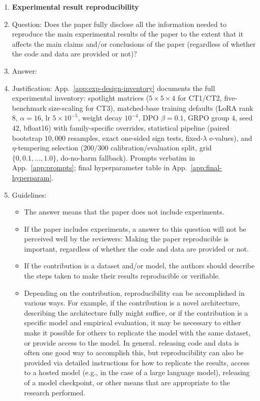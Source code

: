 \begin{enumerate}
\item \textbf{Experimental result reproducibility}
    \item[] Question: Does the paper fully disclose all the information needed to reproduce the main experimental results of the paper to the extent that it affects the main claims and/or conclusions of the paper (regardless of whether the code and data are provided or not)?
    \item[] Answer: \answerYes{}
    \item[] Justification: App.~\ref{app:exp-design-inventory} documents the full experimental inventory: spotlight matrices ($5\!\times\!5\!\times\!4$ for CT1/CT2, five-benchmark size-scaling for CT3), matched-base training defaults (LoRA rank $8$, $\alpha\!=\!16$, lr $5\!\times\!10^{-5}$, weight decay $10^{-4}$, DPO $\beta\!=\!0.1$, GRPO group $4$, seed $42$, bfloat16) with family-specific overrides, statistical pipeline (paired bootstrap $10{,}000$ resamples, exact one-sided sign tests, fixed-$\lambda$ e-values), and $\eta$-tempering selection ($200/300$ calibration/evaluation split, grid $\{0,0.1,\ldots,1.0\}$, do-no-harm fallback). Prompts verbatim in App.~\ref{app:prompts}; final hyperparameter table in App.~\ref{app:final-hyperparam}.
    \item[] Guidelines:
    \begin{itemize}
        \item The answer \answerNA{} means that the paper does not include experiments.
        \item If the paper includes experiments, a \answerNo{} answer to this question will not be perceived well by the reviewers: Making the paper reproducible is important, regardless of whether the code and data are provided or not.
        \item If the contribution is a dataset and\slash or model, the authors should describe the steps taken to make their results reproducible or verifiable.
        \item Depending on the contribution, reproducibility can be accomplished in various ways. For example, if the contribution is a novel architecture, describing the architecture fully might suffice, or if the contribution is a specific model and empirical evaluation, it may be necessary to either make it possible for others to replicate the model with the same dataset, or provide access to the model. In general. releasing code and data is often one good way to accomplish this, but reproducibility can also be provided via detailed instructions for how to replicate the results, access to a hosted model (e.g., in the case of a large language model), releasing of a model checkpoint, or other means that are appropriate to the research performed.

\end{itemize}
\end{enumerate}
